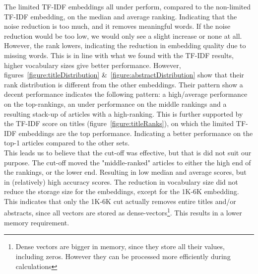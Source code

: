 \documentclass[../../Thesis.tex]{subfiles}
\begin{document}
\begin{jumpin}
The limited TF-IDF embeddings all under perform, compared to the non-limited TF-IDF embedding, on the median and average ranking. Indicating that the noise reduction is too much, and it removes meaningful words. If the noise reduction would be too low, we would only see a slight increase or none at all. However, the rank lowers, indicating the reduction in embedding quality due to missing words. This is in line with what we found with the TF-IDF results, higher vocabulary sizes give better performance. However, figures~\ref{figure:titleDistribution} \&~\ref{figure:abstractDistribution} show that their rank distribution is different from the other embeddings. Their pattern show a decent performance indicates the following pattern: a high/average performance on the top-rankings, an under performance on the middle rankings and  a resulting stack-up of articles with a high-ranking. This is further supported by the TF-IDF score on titles (figure~\ref{figure:titleRanks}), on which the limited TF-IDF embeddings are the top performance. Indicating a better performance on the top-1 articles compared to the other sets.\\This leads us to believe that the cut-off was effective, but that is did not suit our purpose. The cut-off moved the "middle-ranked"  articles to either the high end of the rankings, or the lower end. Resulting in low median and average scores, but in (relatively) high accuracy scores. The reduction in vocabulary size did not reduce the storage size for the embeddings, except for the 1K-6K embedding. This indicates that only the 1K-6K cut actually removes entire titles and/or abstracts, since all vectors are stored as dense-vectors\footnote{Dense vectors are bigger in memory, since they store all their values, including zeros. However they can be processed more efficiently during calculations}. This results in a lower memory requirement.


\end{jumpin}
\end{document}
